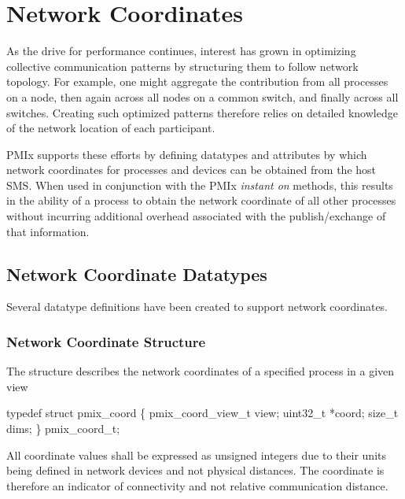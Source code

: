 \chapter{Network Coordinates}
\label{chap:network_coords}

As the drive for performance continues, interest has grown in optimizing collective communication patterns by structuring them to follow network topology. For example, one might aggregate the contribution from all processes on a node, then again across all nodes on a common switch, and finally across all switches. Creating such optimized patterns therefore relies on detailed knowledge of the network location of each participant.

\ac{PMIx} supports these efforts by defining datatypes and attributes by which network coordinates for processes and devices can be obtained from the host \ac{SMS}. When used in conjunction with the \ac{PMIx} \emph{instant on} methods, this results in the ability of a process to obtain the network coordinate of all other processes without incurring additional overhead associated with the publish/exchange of that information.

\section{Network Coordinate Datatypes}

Several datatype definitions have been created to support network coordinates.

\subsection{Network Coordinate Structure}

The  structure describes the network coordinates of a specified process in a given view

\cspecificstart
\begin{codepar}
typedef struct pmix_coord \{
    pmix_coord_view_t view;
    uint32_t *coord;
    size_t dims;
\} pmix_coord_t;
\end{codepar}
\cspecificend

All coordinate values shall be expressed as unsigned integers due to their units being defined in network devices and not physical distances. The coordinate is therefore an indicator of connectivity and not relative communication distance.


